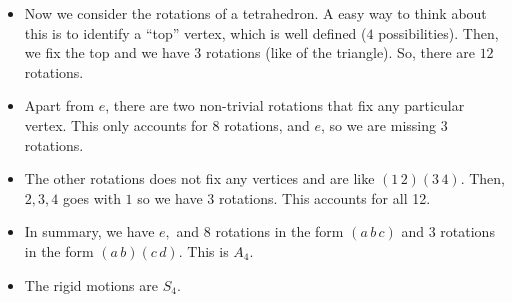 \documentclass[a4paper]{article}
\begin{document}
\begin{itemize}
    \item Now we consider the rotations of a tetrahedron. A easy way to think about this is to identify a ``top'' vertex, which is well defined ($4$ possibilities). Then, we fix the top and we have $3$ rotations (like of the triangle). So, there are $12$ rotations.
    \item Apart from $e$, there are two non-trivial rotations that fix any particular vertex. This only accounts for $8$ rotations, and $e$, so we are missing $3$ rotations. 
    \item The other rotations does not fix any vertices and are like $(1\,2)(3\,4).$ Then, $2,3,4$ goes with $1$ so we have $3$ rotations. This accounts for all 12.
    \item In summary, we have $e,$ and $8$ rotations in the form $(a\,b\,c)$ and $3$ rotations in the form $(a\,b)(c\,d).$ This is $A_4.$
    \item The rigid motions are $S_4.$
\end{itemize}
\end{document}
